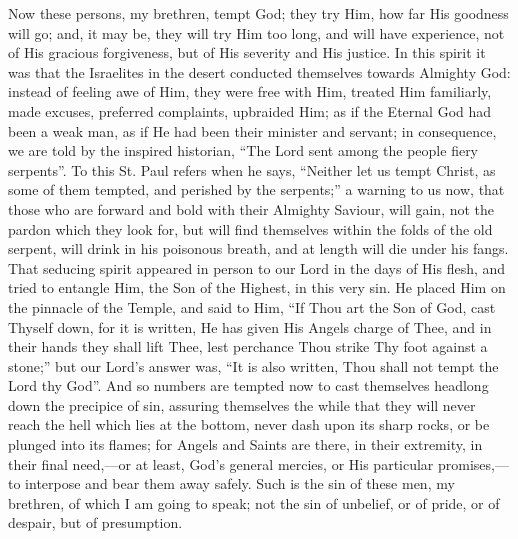 Now these persons, my brethren, tempt God; they try Him, how far
His goodness will go; and, it may be, they will try Him too long, and
will have experience, not of His gracious forgiveness, but of His severity and His justice. In this spirit it was that the Israelites in
the desert conducted themselves towards Almighty God: instead of
feeling awe of Him, they were free with Him, treated Him familiarly,
made excuses, preferred complaints, upbraided Him; as if the Eternal
God had been a weak man, as if He had been their minister and servant;
in consequence, we are told by the inspired historian, ``The Lord
sent among the people fiery serpents''. To this St. Paul refers
when he says, ``Neither let us tempt Christ, as some of them
tempted, and perished by the serpents;'' a warning to us now, that
those who are forward and bold with their Almighty Saviour, will gain,
not the pardon which they look for, but will find themselves within
the folds of the old serpent, will drink in his poisonous breath, and
at length will die under his fangs. That seducing spirit appeared in
person to our Lord in the days of His flesh, and tried to entangle
Him, the Son of the Highest, in this very sin. He placed Him on the
pinnacle of the Temple, and said to Him, ``If Thou art the Son of
God, cast Thyself down, for it is written, He has given His Angels
charge of Thee, and in their hands they shall lift Thee, lest
perchance Thou strike Thy foot against a stone;'' but our Lord's
answer was, ``It is also written, Thou shall not tempt the Lord
thy God''. And so numbers are tempted now to cast themselves
headlong down the precipice of sin, assuring themselves the while that
they will never reach the hell which lies at the bottom, never dash
upon its sharp rocks, or be plunged into its flames; for Angels and
Saints are there, in their extremity, in their final need,—or at
least, God's general mercies, or His particular promises,—to
interpose and bear them away safely. Such is the sin of these men, my
brethren, of which I am going to speak; not the sin of unbelief, or of
pride, or of despair, but of presumption.

